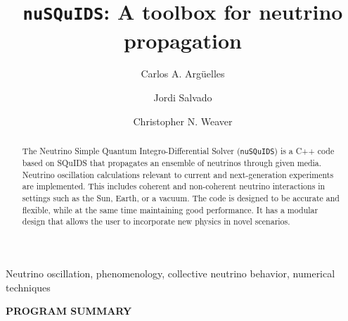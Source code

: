 \documentclass[3p,12pt]{elsarticle}
\begin{document}
\begin{frontmatter}

\title{\texttt{nuSQuIDS}: A toolbox for neutrino propagation\ifdefined\forjournal\else{}\fi}

\author[HU]{Carlos A. Arg\"uelles}
\author[UB]{Jordi Salvado}
\author[MSU]{Christopher N. Weaver}

\address[HU]{Department of Physics \& Laboratory for Particle Physics and Cosmology, Harvard University, Cambridge, MA 02138, USA}
\address[UB]{Departament de F\'isica Qu\`antica i Astrofísica and Institut de Ciencies del Cosmos,
Universitat de Barcelona, Diagonal 647, E-08028 Barcelona, Spain}
\address[MSU]{Dept. of Physics and Astronomy, Michigan State University, East Lansing, MI 48824, USA}

\ifdefined\manualonly
\else %
\ifdefined\forjournal
{}
\else
{}
\fi %

\begin{abstract}
The Neutrino Simple Quantum Integro-Differential Solver (\texttt{nuSQuIDS})
is a C++ code based on SQuIDS that propagates an ensemble of neutrinos
through given media. Neutrino oscillation calculations relevant to
current and next-generation experiments are implemented. 
This includes coherent and non-coherent neutrino interactions in
settings such as the Sun, Earth, or a vacuum.
The code is designed to be accurate and flexible, while at the
same time maintaining good performance. It has a modular design that
allows the user to incorporate new physics in novel scenarios. 
\end{abstract}

\begin{keyword}
Neutrino oscillation, phenomenology, collective neutrino behavior, numerical techniques
\end{keyword}
\fi %

\end{frontmatter}

\ifdefined\forjournal
{\bf PROGRAM SUMMARY}
\end{document}
